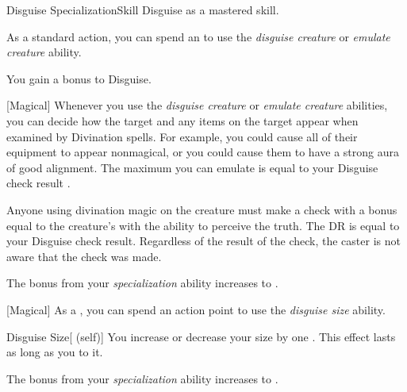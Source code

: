     \begin{feat}{Disguise Specialization}{Skill}
        \featpre Disguise as a mastered skill.

         As a standard action, you can spend an  to use the \textit{disguise creature} or \textit{emulate creature} ability.

         You gain a  bonus to Disguise.

        [Magical] Whenever you use the \textit{disguise creature} or \textit{emulate creature} abilities, you can decide how the target and any items on the target appear when examined by Divination spells.
        For example, you could cause all of their equipment to appear nonmagical, or you could cause them to have a strong aura of good alignment.
        The maximum  you can emulate is equal to your Disguise check result .

        Anyone using divination magic on the creature must make a check with a bonus equal to the creature's  with the ability to perceive the truth.
        The DR is equal to your Disguise check result.
        Regardless of the result of the check, the caster is not aware that the check was made.

         The bonus from your \textit{specialization} ability increases to .

        [Magical] As a , you can spend an action point to use the \textit{disguise size} ability.
        \begin{ability}{Disguise Size}[ (self)]
            You increase or decrease your size by one .
            This effect lasts as long as you  to it.
        \end{ability}

         The bonus from your \textit{specialization} ability increases to .
    \end{feat}

